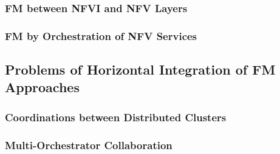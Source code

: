 \subsubsection{FM between NFVI and NFV Layers}

\subsubsection{FM by Orchestration of NFV Services}

\subsection{Problems of Horizontal Integration of FM Approaches}

\subsubsection{Coordinations between Distributed Clusters}

\subsubsection{Multi-Orchestrator Collaboration}
